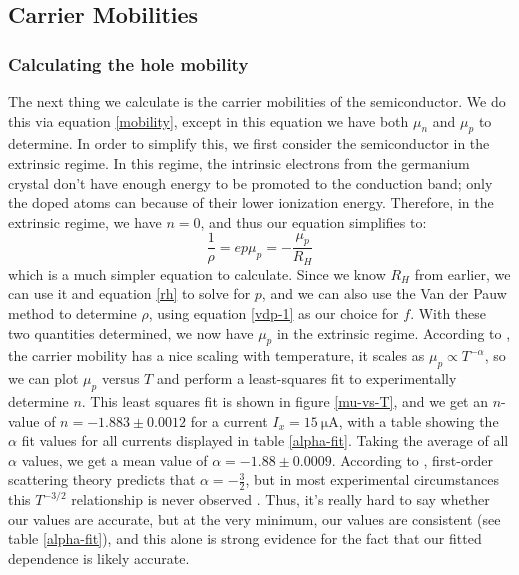 \documentclass[10pt]{article}
\begin{document}
	\subsection{Carrier Mobilities}

	\subsubsection{Calculating the hole mobility}
	The next thing we calculate is the carrier mobilities of the semiconductor. We do this via equation
	\ref{mobility}, except in this equation we have both \( \mu_n \) and \( \mu_p \) to determine. In order
	to simplify this, we first consider the semiconductor in the extrinsic regime. In this regime, the
	intrinsic electrons from the germanium crystal don't have enough energy to be promoted to the conduction
	band; only the doped atoms can because of their lower ionization energy. Therefore, in the extrinsic
	regime, we have \( n = 0 \), and thus our equation simplifies to:
	\begin{equation}
		\label{carrier-extrinsic}
		\frac{1}{\rho} = e p \mu_p = -\frac{\mu_p}{R_H}
	\end{equation}
	which is a much simpler equation to calculate. Since we know \( R_H \) from earlier, we can use it and
	equation \ref{rh} to solve for \( p \), and we can also use the Van der Pauw method to determine \( \rho
	\), using equation \ref{vdp-1} as our choice for \( f \). With these two quantities determined, we now
	have \( \mu_p \) in the extrinsic regime. According to \cite{neamen}, the carrier mobility has a nice scaling
	with temperature, it scales as \( \mu_p \propto T^{-\alpha} \), so we can plot \( \mu_p \) versus \( T \) and
	perform a least-squares fit to experimentally determine \( n \). This least squares fit is shown in
	figure \ref{mu-vs-T}, and we get an \( n \)-value of \( n = -1.883 \pm 0.0012 \) for a current \( I_x =
	\SI{15}{\micro\ampere} \), with a table showing the \( \alpha \) fit values for all currents displayed in
	table \ref{alpha-fit}. Taking the average of all \( \alpha \) values, we get a mean value of \( \alpha = -1.88 \pm
	0.0009 \). 
	According to \cite{neamen}, first-order scattering theory predicts that \( \alpha =
	-\frac{3}{2} \), but in most experimental circumstances this \( T^{- 3 / 2} \) relationship is never
	observed \cite{melissinos}. Thus, it's really hard to say whether our values are accurate, but at the very minimum,
	our values are consistent (see table \ref{alpha-fit}), and this alone is strong evidence for the fact
	that our fitted dependence is likely accurate. 
	
\end{document}
